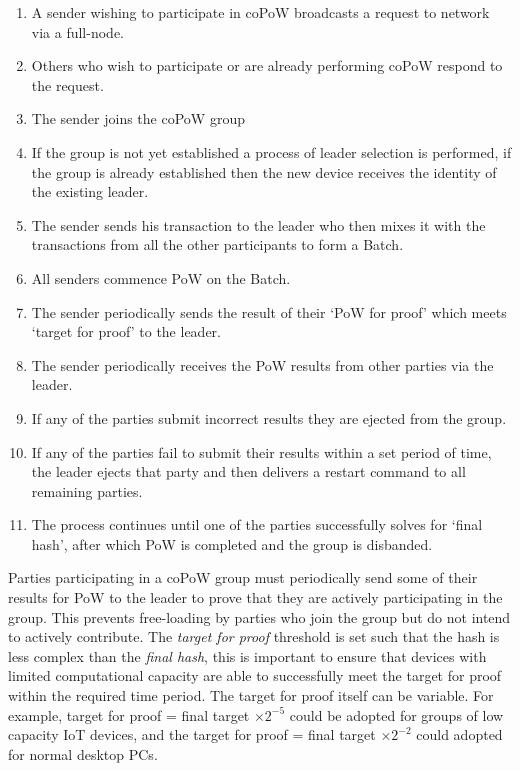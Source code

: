 \documentclass[a4paper,10pt,twocolumn]{article}
\begin{document}
\vspace{-0.5\baselineskip}
\begin{enumerate}
	\setlength\itemsep{0em}
	\item A sender wishing to participate in coPoW broadcasts a request to network via a full-node.
	\item Others who wish to participate or are already performing coPoW respond to the request.
	\item The sender joins the coPoW group
	\item If the group is not yet established a process of leader selection is performed, if the group is already established then 
	the new device receives the identity of the existing leader.
	\item The sender sends his transaction to the leader who then mixes it with the transactions from all the other participants to 
	form a Batch.
	\item All senders commence PoW on the Batch.
	\item The sender periodically sends the result of their `PoW for proof' which meets `target for proof' to the leader.
	\item The sender periodically receives the PoW results from other parties via the leader. 
	\item If any of the parties submit incorrect results they are ejected from the group.
	\item If any of the parties fail to submit their results within a set period of time, the leader ejects that party and then 
	delivers a restart command to all remaining parties.
	\item The process continues until one of the parties successfully solves for `final hash', after which PoW is completed and 
	the group is disbanded.
\end{enumerate}

Parties participating in a coPoW group must periodically send some of their results for PoW to the leader to prove 
that they are actively participating in the group. This prevents free-loading by parties who join the group but do not intend to 
actively contribute. The \emph{target for proof} threshold is set such that the hash is less complex than the \emph{final hash},
this is important to ensure that devices with limited computational capacity are able to successfully meet the 
target for proof within the required time period. The target for proof itself can be variable. For example, target for proof = final 
target \(  \times 2^{-5} \) could be adopted for groups of low capacity IoT devices, and the target for proof = final target  \( \times 
2^{-2} \) could adopted for normal desktop PCs.
\end{document}
